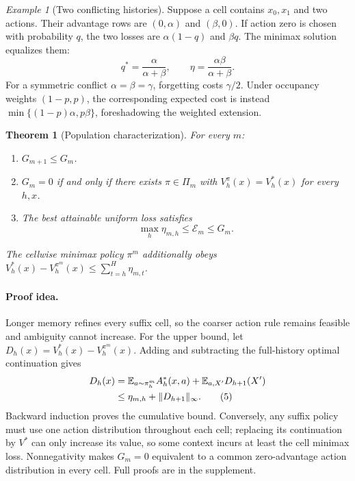 \documentclass[letterpaper]{article} %
\newtheorem{theorem}{Theorem}
\theoremstyle{remark}
\newtheorem{example}{Example}
\newcommand{\E}{\mathbb E}
\begin{document}
\begin{example}[Two conflicting histories]
Suppose a cell contains $x_0,x_1$ and two actions. Their advantage rows are
$(0,\alpha)$ and $(\beta,0)$. If action zero is chosen with probability $q$,
the two losses are $\alpha(1-q)$ and $\beta q$. The minimax solution equalizes
them:
\[
q^*=\frac{\alpha}{\alpha+\beta},\qquad
\eta=\frac{\alpha\beta}{\alpha+\beta}.
\tag{3}\label{eq:closedform}
\]
For a symmetric conflict $\alpha=\beta=\gamma$, forgetting costs
$\gamma/2$. Under occupancy weights $(1-p,p)$, the corresponding expected
cost is instead $\min\{(1-p)\alpha,p\beta\}$, foreshadowing the weighted
extension.
\end{example}

\begin{theorem}[Population characterization]\label{thm:population}
For every $m$:
\begin{enumerate}
  \item $G_{m+1}\leq G_m$.
  \item $G_m=0$ if and only if there exists $\pi\in\Pi_m$ with
  $V_h^\pi(x)=V_h^*(x)$ for every $h,x$.
  \item The best attainable uniform loss satisfies
  \[
  \max_h\eta_{m,h}\leq\mathcal E_m\leq G_m.
  \tag{4}\label{eq:sandwich}
  \]
\end{enumerate}
The cellwise minimax policy $\pi^m$ additionally obeys
$V_h^*(x)-V_h^{\pi^m}(x)\leq\sum_{t=h}^H\eta_{m,t}$.
\end{theorem}

\paragraph{Proof idea.}
Longer memory refines every suffix cell, so the coarser action rule remains
feasible and ambiguity cannot increase. For the upper bound, let
$D_h(x)=V_h^*(x)-V_h^{\pi^m}(x)$. Adding and subtracting the full-history
optimal continuation gives
\begin{align}
D_h(x)
&=\E_{a\sim\pi_h^m}A_h^*(x,a)
 +\E_{a,X'}D_{h+1}(X') \notag\\
&\leq\eta_{m,h}+\|D_{h+1}\|_\infty.
\tag{5}\label{eq:recursion}
\end{align}
Backward induction proves the cumulative bound. Conversely, any suffix policy
must use one action distribution throughout each cell; replacing its
continuation by $V^*$ can only increase its value, so some context incurs at
least the cell minimax loss. Nonnegativity makes $G_m=0$ equivalent to a
common zero-advantage action distribution in every cell. Full proofs are in
the supplement.
\end{document}
